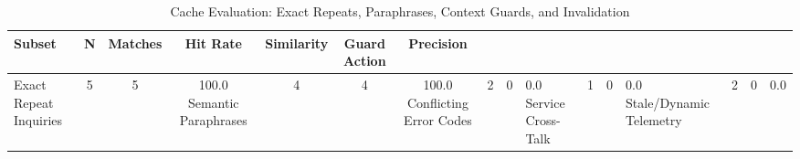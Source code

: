 \begin{table}[h]
\centering
\caption{Cache Evaluation: Exact Repeats, Paraphrases, Context Guards, and Invalidation}
\label{tab:table3_cache_evaluation}
\begin{tabular}{lcccccc}
\hline
\textbf{Subset} & \textbf{N} & \textbf{Matches} & \textbf{Hit Rate} & \textbf{Similarity} & \textbf{Guard Action} & \textbf{Precision} \\
\hline
Exact Repeat Inquiries & 5 & 5 & 100.0%
Semantic Paraphrases & 4 & 4 & 100.0%
Conflicting Error Codes & 2 & 0 & 0.0%
Service Cross-Talk & 1 & 0 & 0.0%
Stale/Dynamic Telemetry & 2 & 0 & 0.0%
\hline
\end{tabular}
\end{table}
